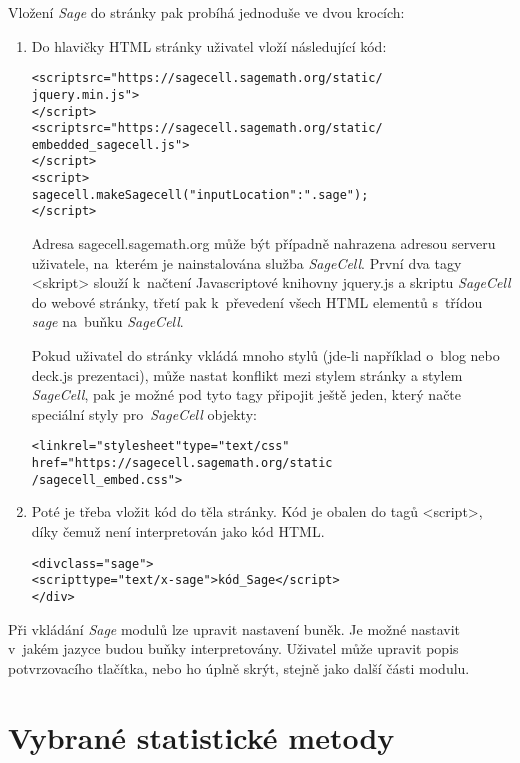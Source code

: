 \documentclass[thesis=B,czech]{FITthesis}[2012/06/26]
\begin{document}
Vložení \textit{Sage} do stránky pak probíhá jednoduše ve dvou krocích: 

\begin{enumerate} 
  \item Do hlavičky HTML stránky uživatel vloží následující kód: 
  
\begin{alltt}
<script src="https://sagecell.sagemath.org/static/
jquery.min.js">
</script>
<script src="https://sagecell.sagemath.org/static/
embedded\_sagecell.js">
</script>
<script>
sagecell.makeSagecell({"inputLocation": ".sage"});
</script>
\end{alltt}

Adresa sagecell.sagemath.org může být případně nahrazena adresou serveru uživatele, na~kterém je nainstalována služba \textit{SageCell}. První dva tagy <skript> slouží k~načtení Javascriptové knihovny jquery.js a skriptu \textit{SageCell} do webové stránky, třetí pak k~převedení všech HTML elementů s~třídou \textit{sage} na~buňku \textit{SageCell}.

Pokud uživatel do stránky vkládá mnoho stylů (jde-li například o~blog nebo deck.js prezentaci), může nastat konflikt mezi stylem stránky a stylem \textit{SageCell}, pak je možné pod tyto tagy připojit ještě jeden, který načte speciální styly pro~\textit{SageCell} objekty:

\begin{alltt}
<link rel="stylesheet" type="text/css" 
href="https://sagecell.sagemath.org/static
/sagecell_embed.css">
\end{alltt}

  \item Poté je třeba vložit kód do těla stránky. Kód je obalen do tagů <script>, díky čemuž není interpretován jako kód HTML. 

\begin{alltt}
<div class="sage">
  <script type="text/x-sage">kód_Sage</script>
</div>
\end{alltt}
  
\end{enumerate}

Při vkládání \textit{Sage} modulů lze upravit nastavení buněk. Je možné nastavit v~jakém jazyce budou buňky interpretovány. Uživatel může upravit popis potvrzovacího tlačítka, nebo ho úplně skrýt, stejně jako další části modulu. 

\chapter{Vybrané statistické metody}
\end{document}
